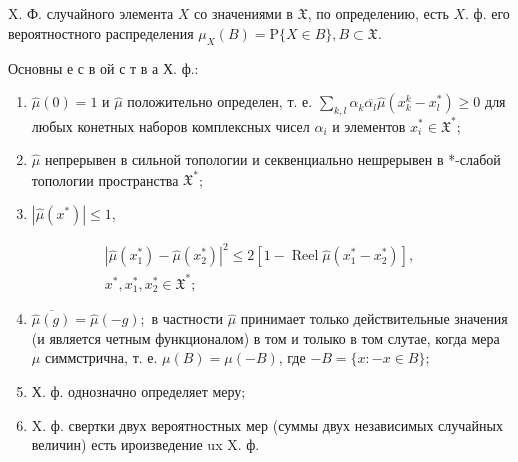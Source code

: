 \documentclass[10pt]{article}
\begin{document}
X. Ф. случайного элемента $X$ со значениями в $\mathfrak{X}$, по определению, есть $X$. ф. его вероятностного распределения $\mu_{X}(B)=\mathrm{P}\{X \in \hat{B}\}, B \subset \mathfrak{X}$.



Основны е с в ой с т в а Х. ф.:



\begin{enumerate}

  \item $\hat{\mu}(0)=1$ и $\hat{\mu}$ положительно определен, т. е. $\sum_{k, l} \alpha_{k} \overline{\alpha_{l}} \hat{\mu}\left(x_{k}^{k}-x_{l}^{*}\right) \geqslant 0$ для любых конетных наборов комплексных чисел $\alpha_{i}$ и элементов $x_{i}^{*} \in \mathfrak{X}^{*}$;



  \item $\hat{\mu}$ непрерывен в сильной топологии и секвенциально нешрерывен в *-слабой топологии пространства $\mathfrak{X}^{*}$;



  \item $\left|\hat{\mu}\left(x^{*}\right)\right| \leqslant 1$,



\end{enumerate}



\[

\begin{gathered}

\left|\hat{\mu}\left(x_{1}^{*}\right)-\hat{\mu}\left(x_{2}^{*}\right)\right|^{2} \leqslant 2\left[1-\operatorname{Reel} \hat{\mu}\left(x_{1}^{*}-x_{2}^{*}\right)\right], \\

x^{*}, x_{1}^{*}, x_{2}^{*} \in \mathfrak{X}^{*} ;

\end{gathered}

\]



\begin{enumerate}

  \setcounter{enumi}{3}

  \item $\overline{\hat{\mu}(g)}=\hat{\mu}(-g) ;$ в частности $\hat{\mu}$ принимает только действительные значения (и является четным функционалом) в том и толыко в том слутае, когда мера $\mu$ симмстрична, т. е. $\mu(B)=\mu(-B)$, где $-B=\{x:-x \in B\}$;



  \item Х. ф. однозначно определяет меру;



  \item X. ф. свертки двух вероятностных мер (суммы двух независимых случайных величин) есть ироизведение ux X. ф.



\end{enumerate}
\end{document}
